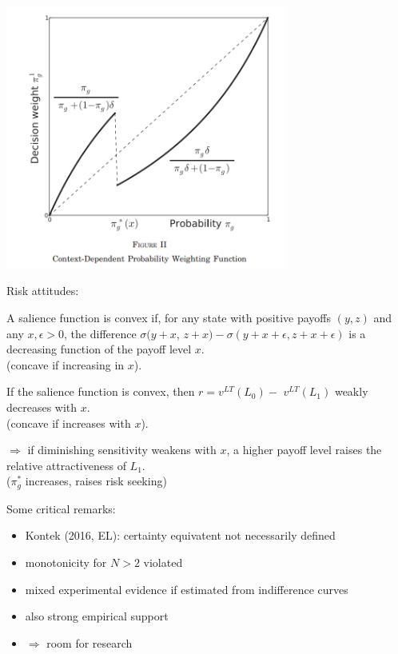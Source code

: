 \documentclass[11pt,aspectratio=169]{beamer}
\begin{document}
\begin{frame}
    \includegraphics[width = 0.69\textwidth]{fig2.png}
\end{frame}


\begin{frame}{Risk attitudes:}
    \begin{definition}[3]
        A salience function is convex if, for any state with positive payoffs $(y, z)$ and any $x, \epsilon>0$,
        the difference $\sigma(y+x$, $z+x)-\sigma(y+x+\epsilon, z+x+\epsilon)$ is a decreasing function of the payoff level $x$.\\
        (concave if increasing in $x$).
    \end{definition}
    \begin{Lemma}[1]
        If the salience function is convex, then $r=v^{L T}\left(L_0\right)-$ $v^{L T}\left(L_1\right)$ weakly decreases with $x$.\\
        (concave if increases with $x$).
    \end{Lemma}
    $\Rightarrow$ if diminishing sensitivity weakens with $x$, a higher payoff level raises the relative attractiveness of  $L_1$.\\
    ($\pi_g^* $ increases, raises risk seeking)
\end{frame}

\begin{frame}{Some critical remarks:}
    \begin{itemize}
        \item Kontek (2016, EL): certainty equivatent not necessarily defined\medskip
        \item monotonicity for $N>2$ violated\medskip
        \item mixed experimental evidence if estimated from indifference curves\medskip
        \item also strong empirical support\medskip
        \item $\Rightarrow$ room for research\medskip
	\end{itemize}
\end{frame}
\end{document}
